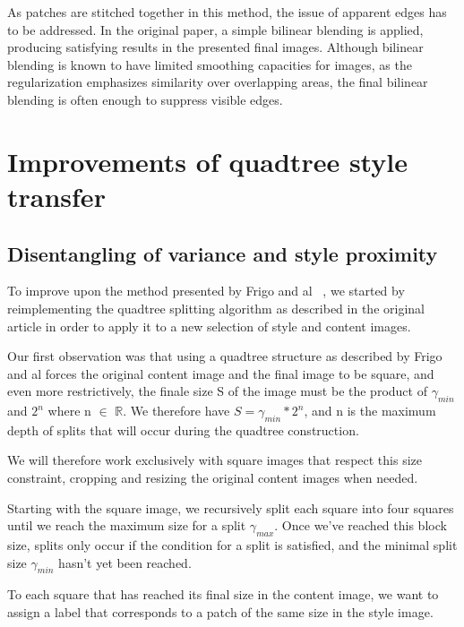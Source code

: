 \documentclass[a4paper]{article}
\begin{document}
As patches are stitched together in this method, the issue of apparent edges has to be addressed. In the original paper, a simple bilinear blending is applied, producing satisfying results in the presented final images. Although bilinear blending is known to have limited smoothing capacities for images, as the regularization emphasizes similarity over overlapping areas, the final bilinear blending is often enough to suppress visible edges.




\section{Improvements of quadtree style transfer}


\subsection{Disentangling of variance and style proximity}

To improve upon the method presented by Frigo and al ~\cite{adaptative-quilting}, we started by reimplementing the quadtree splitting algorithm as described in the original article in order to apply it to a new selection of style and content images. 

Our first observation was that using a quadtree structure as described by Frigo and al forces the original content image and the final image to be square, and even more restrictively, the finale size S of the image must be the product of ${\gamma_{min}}$ and ${2^n}$ where n $\in$ $\mathbb{R}$.
We therefore have ${S = \gamma_{min}*2^n}$, and n is the maximum depth of splits that will occur during the quadtree construction.

We will therefore work exclusively with square images that respect this size constraint, cropping and resizing the original content images when needed. 

Starting with the square image, we recursively split each square into four squares until we reach the maximum size for a split ${\gamma_{max}}$. Once we've reached this block size, splits only occur if the condition for a split is satisfied, and the minimal split size ${\gamma_{min}}$ hasn't yet been reached.

To each square that has reached its final size in the content image, we want to assign a label that corresponds to a patch of the same size in the style image.
\end{document}
